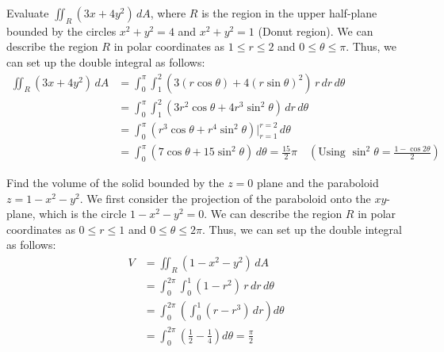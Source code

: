 \documentclass[11pt]{report}
\begin{document}
\begin{example}
    Evaluate $\iint_R (3x + 4y^2) \, dA$, where $R$ is the region in the upper half-plane bounded by the circles $x^2 + y^2 = 4$ and $x^2 + y^2 = 1$ (Donut region).
    We can describe the region $R$ in polar coordinates as $1 \le r \le 2$ and $0 \le \theta \le \pi$. Thus, we can set up the double integral as follows:
    \begin{align*}
        \iint_R (3x + 4y^2) \, dA &= \int_0^\pi \int_1^2 (3(r \cos{\theta}) + 4(r \sin{\theta})^2) \, r \, dr \, d\theta \\
        &= \int_0^\pi \int_1^2 (3r^2 \cos{\theta} + 4r^3 \sin^2{\theta}) \, dr \, d\theta \\
        &= \int_0^\pi (r^3\cos \theta + r^4 \sin^2 \theta) \Big|_{r=1}^{r=2} \, d\theta \\
        &= \int_0^\pi (7\cos \theta + 15 \sin^2 \theta) \, d\theta = \frac{15}{2} \pi \quad \left(\text{Using } \sin^2 \theta = \frac{1 - \cos 2\theta}{2}\right)
    \end{align*}
\end{example}

\begin{example}
    Find the volume of the solid bounded by the $z=0$ plane and the paraboloid $z = 1 - x^2 - y^2$. We first consider the projection of the paraboloid onto the $xy$-plane, which is the circle $1 - x^2 - y^2 = 0$. We can describe the region $R$ in polar coordinates as $0 \le r \le 1$ and $0 \le \theta \le 2\pi$. Thus, we can set up the double integral as follows:
    \begin{align*}
        V &= \iint_R (1 - x^2 - y^2) \, dA \\
        &= \int_0^{2\pi} \int_0^1 (1 - r^2) \, r \, dr \, d\theta \\
        &= \int_0^{2\pi} \left( \int_0^1 (r - r^3) \, dr \right) d\theta \\
        &= \int_0^{2\pi} \left( \frac{1}{2} - \frac{1}{4} \right) d\theta  = \frac{\pi}{2}
    \end{align*}
\end{example}
\end{document}
